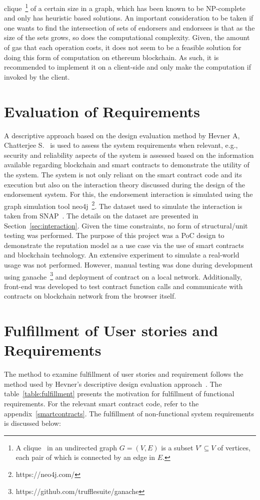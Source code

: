 clique~\footnote{A clique~\cite{cormen2009introduction} in an undirected graph
	$G = ( V,E)$ is a subset $V' \subseteq V$ of vertices, each pair of which
is connected by an edge in $E$.} of a certain size in a graph, which has been
known to be NP-complete and only has heuristic based solutions.  An important
consideration to be taken if one wants to find the intersection of sets of
endorsers and endorsees is that as the size of the sets grows, so does the
computational complexity. Given, the amount of gas that each operation costs,
it does not seem to be a feasible solution for doing this form of computation
on ethereum blockchain. As such, it is recommended to implement it on a
client-side and only make the computation if invoked by the client.

\section{Evaluation of Requirements}
A descriptive approach based on the design evaluation method by Hevner A,
Chatterjee S.~\cite{hevner2010design} is used to assess the system requirements
when relevant, e.g., security and reliability aspects of the system is assessed
based on the information available regarding blockchain and smart contracts to
demonstrate the utility of the system. The system is not only reliant on the
smart contract code and its execution but also on the interaction theory
discussed during the design of the endorsement system. For this, the
endorsement interaction is simulated using the graph simulation tool
neo4j~\footnote{https://neo4j.com/}. The dataset used to simulate the
interaction is taken from SNAP~\cite{snapnets}. The details on the dataset are
presented in Section~\ref{sec:interaction}. Given the time constraints, no form
of structural/unit testing was performed. The purpose of this project was a PoC
design to demonstrate the reputation model as a use case via the use of smart
contracts and blockchain technology. An extensive experiment to simulate a
real-world usage was not performed. However, manual testing was done during
development using ganache~\footnote{https://github.com/trufflesuite/ganache}
and deployment of contract on a local network. Additionally, front-end was
developed to test contract function calls and communicate with contracts on
blockchain network from the browser itself.  

\section{Fulfillment of User stories and Requirements}\label{fulfillment}
The method to examine fulfillment of user stories and requirement follows the
method used by Hevner's descriptive design evaluation
approach~\cite{hevner2010design}. The table~\ref{table:fulfillment} presents
the motivation for fulfillment of functional requirements. For the relevant
smart contract code, refer to the appendix~\ref{smartcontracts}. 
The fulfillment of non-functional system requirements is discussed below:
